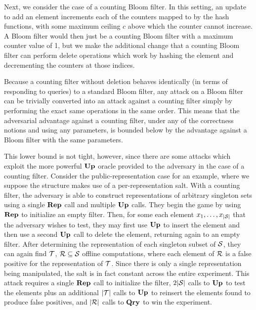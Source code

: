 Next, we consider the case of a counting Bloom filter. In this setting, an update to add an element increments each of the counters mapped to by the hash functions, with some maximum ceiling $c$ above which the counter cannot increase. A Bloom filter would then just be a counting Bloom filter with a maximum counter value of 1, but we make the additional change that a counting Bloom filter can perform delete operations which work by hashing the element and decrementing the counters at those indices.

Because a counting filter without deletion behaves identically (in terms of responding to queries) to a standard Bloom filter, any attack on a Bloom filter can be trivially converted into an attack against a counting filter simply by performing the exact same operations in the same order. This means that the adversarial advantage against a counting filter, under any of the correctness notions and using any parameters, is bounded below by the advantage against a Bloom filter with the same parameters.

This lower bound is not tight, however, since there are some attacks which exploit the more powerful $\mathbf{Up}\hspace{0.5pt}$ oracle provided to the adversary in the case of a counting filter. Consider the public-representation case for an example, where we suppose the structure makes use of a per-representation salt. With a counting filter, the adversary is able to construct representations of arbitrary singleton sets using a single $\mathbf{Rep}\hspace{0.5pt}$ call and multiple $\mathbf{Up}\hspace{0.5pt}$ calls. They begin the game by using $\mathbf{Rep}\hspace{0.5pt}$ to initialize an empty filter. Then, for some each element $x_1, \ldots, x_{|\mathcal{S}|}$ that the adversary wishes to test, they may first use $\mathbf{Up}\hspace{0.5pt}$ to insert the element and then use a second $\mathbf{Up}\hspace{0.5pt}$ call to delete the element, returning again to an empty filter. After determining the representation of each singleton subset of $\mathcal{S}$, they can again find $\mathcal{T}$, $\mathcal{R} \subseteq \mathcal{S}$ offline computations, where each element of $\mathcal{R}$ is a false positive for the representation of $\mathcal{T}$. Since there is only a single representation being manipulated, the salt is in fact constant across the entire experiment. This attack requires a single $\mathbf{Rep}\hspace{0.5pt}$ call to initialize the filter, $2|\mathcal{S}|$ calls to $\mathbf{Up}\hspace{0.5pt}$ to test the elements plus an additional $|\mathcal{T}|$ calls to $\mathbf{Up}\hspace{0.5pt}$ to reinsert the elements found to produce false positives, and $|\mathcal{R}|$ calls to $\mathbf{Qry}\hspace{0.5pt}$ to win the experiment.

